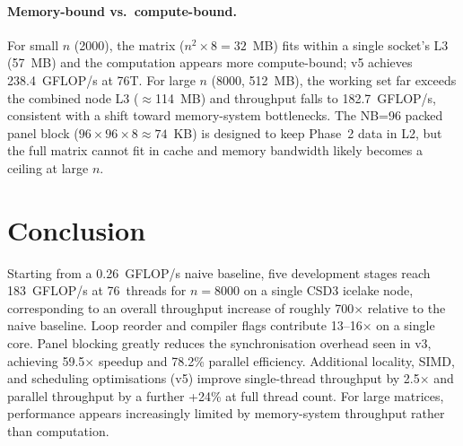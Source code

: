\documentclass{article}
\begin{document}
\paragraph{Memory-bound vs.\ compute-bound.}
For small $n$ (2000), the matrix ($n^2 \times 8 = 32$~MB) fits within a
single socket's L3 (57~MB) and the computation appears more compute-bound;
v5 achieves 238.4~GFLOP/s at 76T.
For large $n$ (8000, 512~MB), the working set far exceeds the combined node
L3 ($\approx$114~MB) and throughput falls to 182.7~GFLOP/s, consistent with
a shift toward memory-system bottlenecks.
The NB=96 packed panel block ($96 \times 96 \times 8 \approx 74$~KB) is
designed to keep Phase~2 data in L2, but the full matrix cannot fit in cache
and memory bandwidth likely becomes a ceiling at large $n$.

\section{Conclusion}

Starting from a 0.26~GFLOP/s naive baseline, five development stages reach
183~GFLOP/s at 76~threads for $n=8000$ on a single CSD3 icelake node,
corresponding to an overall throughput increase of roughly 700$\times$
relative to the naive baseline.
Loop reorder and compiler flags contribute 13--16$\times$ on a single core.
Panel blocking greatly reduces the synchronisation overhead seen in v3,
achieving 59.5$\times$ speedup and 78.2\% parallel efficiency.
Additional locality, SIMD, and scheduling optimisations (v5) improve
single-thread throughput by 2.5$\times$ and parallel throughput by a further
+24\% at full thread count.
For large matrices, performance appears increasingly limited by memory-system
throughput rather than computation.
\end{document}
